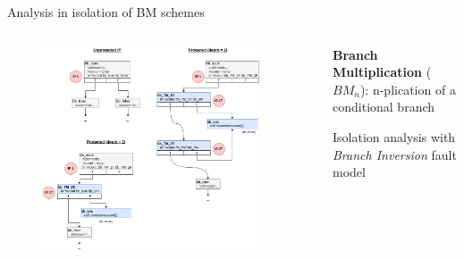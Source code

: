 \begin{frame}[fragile]{Analysis in isolation of BM schemes}
    \begin{columns}
        \begin{column}{0.45\textwidth}
            \begin{figure}
                \includegraphics[scale=0.20]{img/cm-mul-test-large.png}
            \end{figure}
            \vfill
        \end{column}
        \begin{column}{0.07\textwidth} \end{column}
        \begin{small}
            \begin{column}{0.48\textwidth}
                \textbf{Branch Multiplication} ($BM_n$): n-plication of a conditional branch                
                \vspace{0.3cm}
                
                Isolation analysis with \textit{Branch Inversion} fault model
                \vspace{0.3cm}
        

\end{column}
\end{small}
\end{columns}
\end{frame}
